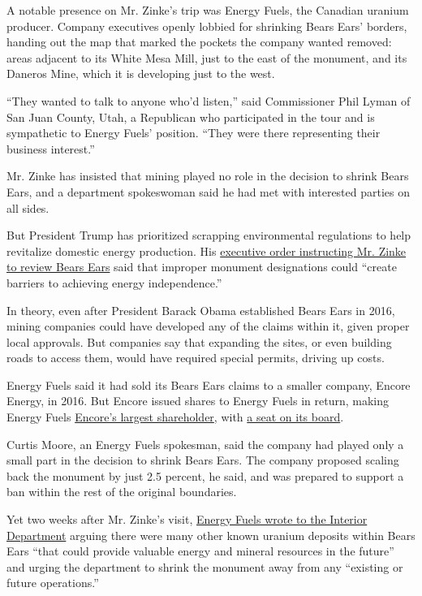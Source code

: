 A notable presence on Mr. Zinke's trip was Energy Fuels, the Canadian
uranium producer. Company executives openly lobbied for shrinking Bears
Ears' borders, handing out the map that marked the pockets the company
wanted removed: areas adjacent to its White Mesa Mill, just to the east
of the monument, and its Daneros Mine, which it is developing just to
the west.

``They wanted to talk to anyone who'd listen,'' said Commissioner Phil
Lyman of San Juan County, Utah, a Republican who participated in the
tour and is sympathetic to Energy Fuels' position. ``They were there
representing their business interest.''

Mr. Zinke has insisted that mining played no role in the decision to
shrink Bears Ears, and a department spokeswoman said he had met with
interested parties on all sides.

But President Trump has prioritized scrapping environmental regulations
to help revitalize domestic energy production. His
\href{https://www.federalregister.gov/documents/2017/05/01/2017-08908/review-of-designations-under-the-antiquities-act}{executive
order instructing Mr. Zinke to review Bears Ears} said that improper
monument designations could ``create barriers to achieving energy
independence.''

In theory, even after President Barack Obama established Bears Ears in
2016, mining companies could have developed any of the claims within it,
given proper local approvals. But companies say that expanding the
sites, or even building roads to access them, would have required
special permits, driving up costs.

Energy Fuels said it had sold its Bears Ears claims to a smaller
company, Encore Energy, in 2016. But Encore issued shares to Energy
Fuels in return, making Energy Fuels
\href{http://encoreenergycorp.com/share-structure/}{Encore's largest
shareholder}, with
\href{http://encoreenergycorp.com/corporate/board-of-directors/}{a seat
on its board}.

Curtis Moore, an Energy Fuels spokesman, said the company had played
only a small part in the decision to shrink Bears Ears. The company
proposed scaling back the monument by just 2.5 percent, he said, and was
prepared to support a ban within the rest of the original boundaries.

Yet two weeks after Mr. Zinke's visit,
\href{https://www.regulations.gov/document?D=DOI-2017-0002-99711}{Energy
Fuels wrote to the Interior Department} arguing there were many other
known uranium deposits within Bears Ears ``that could provide valuable
energy and mineral resources in the future'' and urging the department
to shrink the monument away from any ``existing or future operations.''

